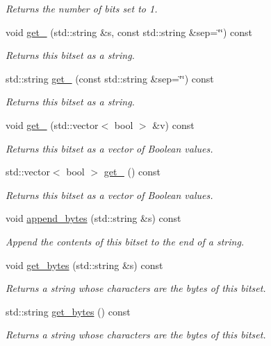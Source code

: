 \begin{DoxyCompactItemize}
\begin{DoxyCompactList}\small\item\em Returns the number of bits set to 1. \end{DoxyCompactList}\item 
void \hyperlink{classlgraph_1_1utils_1_1static__bitset_a65b05d1b55f6cad0bc7dca064ea4f086}{get\-\_} (std\-::string \&s, const std\-::string \&sep=\char`\"{}\char`\"{}) const 
\begin{DoxyCompactList}\small\item\em Returns this bitset as a string. \end{DoxyCompactList}\item 
std\-::string \hyperlink{classlgraph_1_1utils_1_1static__bitset_a85e55cf69027d41461b00b26e51ffdc7}{get\-\_} (const std\-::string \&sep=\char`\"{}\char`\"{}) const 
\begin{DoxyCompactList}\small\item\em Returns this bitset as a string. \end{DoxyCompactList}\item 
void \hyperlink{classlgraph_1_1utils_1_1static__bitset_aaec34604847e776c7001d3ca1a19c62d}{get\-\_} (std\-::vector$<$ bool $>$ \&v) const 
\begin{DoxyCompactList}\small\item\em Returns this bitset as a vector of Boolean values. \end{DoxyCompactList}\item 
std\-::vector$<$ bool $>$ \hyperlink{classlgraph_1_1utils_1_1static__bitset_a0177a5417170fb9594d22bc0bbc5fe6d}{get\-\_} () const 
\begin{DoxyCompactList}\small\item\em Returns this bitset as a vector of Boolean values. \end{DoxyCompactList}\item 
void \hyperlink{classlgraph_1_1utils_1_1static__bitset_ae0a88fd151a68c5a37dbc0f65034fed6}{append\-\_\-bytes} (std\-::string \&s) const 
\begin{DoxyCompactList}\small\item\em Append the contents of this bitset to the end of a string. \end{DoxyCompactList}\item 
void \hyperlink{classlgraph_1_1utils_1_1static__bitset_a41f63458ec3fece4875641cc5ff9fb5b}{get\-\_\-bytes} (std\-::string \&s) const 
\begin{DoxyCompactList}\small\item\em Returns a string whose characters are the bytes of this bitset. \end{DoxyCompactList}\item 
std\-::string \hyperlink{classlgraph_1_1utils_1_1static__bitset_a53eaf5cee86a8ca0565018773f3f2dc0}{get\-\_\-bytes} () const 
\begin{DoxyCompactList}\small\item\em Returns a string whose characters are the bytes of this bitset. \end{DoxyCompactList}\end{DoxyCompactItemize}
